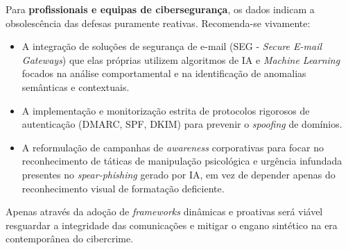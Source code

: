 \documentclass[pdflatex,sn-mathphys-num]{sn-jnl}
\theoremstyle{thmstyleone}%
\theoremstyle{thmstyletwo}%
\theoremstyle{thmstylethree}%
\begin{document}
Para \textbf{profissionais e equipas de cibersegurança}, os dados indicam a obsolescência das defesas puramente reativas. Recomenda-se vivamente:
\begin{itemize}
    \item A integração de soluções de segurança de e-mail (SEG - \textit{Secure E-mail Gateways}) que elas próprias utilizem algoritmos de IA e \textit{Machine Learning} focados na análise comportamental e na identificação de anomalias semânticas e contextuais.
    \item A implementação e monitorização estrita de protocolos rigorosos de autenticação (DMARC, SPF, DKIM) para prevenir o \textit{spoofing} de domínios.
    \item A reformulação de campanhas de \textit{awareness} corporativas para focar no reconhecimento de táticas de manipulação psicológica e urgência infundada presentes no \textit{spear-phishing} gerado por IA, em vez de depender apenas do reconhecimento visual de formatação deficiente.
\end{itemize}

Apenas através da adoção de \textit{frameworks} dinâmicas e proativas será viável resguardar a integridade das comunicações e mitigar o engano sintético na era contemporânea do cibercrime.


\backmatter


\newpage

\end{document}
